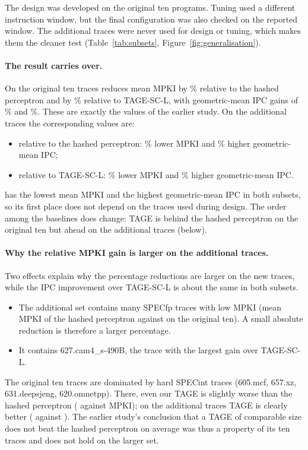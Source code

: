The design was developed on the original ten programs. Tuning used a different instruction window, but the final configuration was also checked on the reported window. The  additional traces were never used for design or tuning, which makes them the cleaner test (Table~\ref{tab:subsets}, Figure~\ref{fig:generalisation}).

\paragraph{The result carries over.} On the original ten traces \prop{} reduces mean MPKI by \% relative to the hashed perceptron and by \% relative to TAGE-SC-L, with geometric-mean IPC gains of \% and \%. These are exactly the values of the earlier study. On the  additional traces the corresponding values are:
\begin{itemize}
\item relative to the hashed perceptron: \% lower MPKI and \% higher geometric-mean IPC;
\item relative to TAGE-SC-L: \% lower MPKI and \% higher geometric-mean IPC.
\end{itemize}
\prop{} has the lowest mean MPKI and the highest geometric-mean IPC in both subsets, so its first place does not depend on the traces used during design. The order among the baselines does change: TAGE is behind the hashed perceptron on the original ten but ahead on the additional traces (below).

\paragraph{Why the relative MPKI gain is larger on the additional traces.} Two effects explain why the percentage reductions are larger on the new traces, while the IPC improvement over TAGE-SC-L is about the same in both subsets.
\begin{itemize}
\item The additional set contains many SPECfp traces with low MPKI (mean MPKI of the hashed perceptron  against  on the original ten). A small absolute reduction is therefore a larger percentage.
\item It contains 627.cam4\_s-490B, the trace with the largest gain over TAGE-SC-L.
\end{itemize}
The original ten traces are dominated by hard SPECint traces (605.mcf, 657.xz, 631.deepsjeng, 620.omnetpp). There, even our TAGE is slightly worse than the hashed perceptron ( against  MPKI); on the additional traces TAGE is clearly better ( against ). The earlier study's conclusion that a TAGE of comparable size does not beat the hashed perceptron on average was thus a property of its ten traces and does not hold on the larger set.

